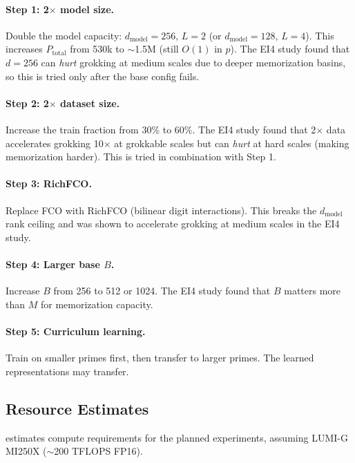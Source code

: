 \documentclass[11pt]{article}
\newcommand{\Ptotal}{P_{\mathrm{total}}}
\newcommand{\dmodel}{d_{\mathrm{model}}}
\begin{document}
\paragraph{Step 1: 2$\times$ model size.}
Double the model capacity: $\dmodel = 256$, $L = 2$ (or $\dmodel = 128$, $L = 4$). This increases $\Ptotal$ from 530k to $\sim$1.5M (still $O(1)$ in $p$). The EI4 study found that $d = 256$ can \emph{hurt} grokking at medium scales due to deeper memorization basins, so this is tried only after the base config fails.

\paragraph{Step 2: 2$\times$ dataset size.}
Increase the train fraction from 30\% to 60\%. The EI4 study found that 2$\times$ data accelerates grokking 10$\times$ at grokkable scales but can \emph{hurt} at hard scales (making memorization harder). This is tried in combination with Step 1.

\paragraph{Step 3: RichFCO.}
Replace FCO with RichFCO (bilinear digit interactions). This breaks the $\dmodel$ rank ceiling and was shown to accelerate grokking at medium scales in the EI4 study.

\paragraph{Step 4: Larger base $B$.}
Increase $B$ from 256 to 512 or 1024. The EI4 study found that $B$ matters more than $M$ for memorization capacity.

\paragraph{Step 5: Curriculum learning.}
Train on smaller primes first, then transfer to larger primes. The learned representations may transfer.

\subsection{Resource Estimates}

 estimates compute requirements for the planned experiments, assuming LUMI-G MI250X ($\sim$200 TFLOPS FP16).
\end{document}
